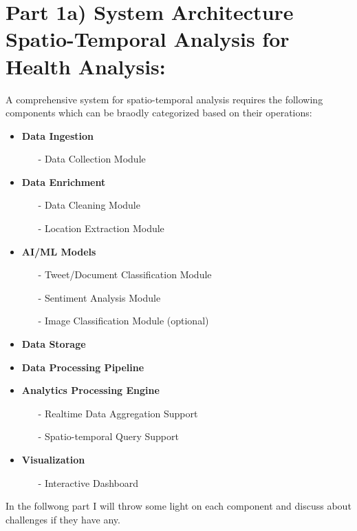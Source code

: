 \section{Part 1a) System Architecture  Spatio-Temporal Analysis for Health Analysis:}
\label{part_a}
A comprehensive system for spatio-temporal analysis requires the following components which can be braodly categorized based on their operations:

\begin{itemize}
  \item \textbf{Data Ingestion}
    {\em
    \begin{itemize}
      \item[-] Data Collection Module
    \end{itemize}
    }
  \item \textbf{Data Enrichment}
    {\em
    \begin{itemize}
    \item[-] Data Cleaning Module
    \item[-] Location Extraction Module
    \end{itemize}
    }
  \item \textbf{AI/ML Models}
    {\em
    \begin{itemize}
      \item[-] Tweet/Document Classification Module
      \item[-] Sentiment Analysis Module
      \item[-] Image Classification Module (optional)
    \end{itemize}
    }
  \item \textbf{Data Storage}
  \item \textbf{Data Processing Pipeline}
  \item \textbf{Analytics Processing Engine}
    {\em
    \begin{itemize}
      \item[-] Realtime Data Aggregation Support
      \item[-] Spatio-temporal Query Support
    \end{itemize}
    }
  \item \textbf{Visualization}
    {\em
    \begin{itemize}
      \item[-] Interactive Dashboard
    \end{itemize}
    }
\end{itemize}

In the follwong part I will throw some light on each component and discuss about challenges if they have any.

